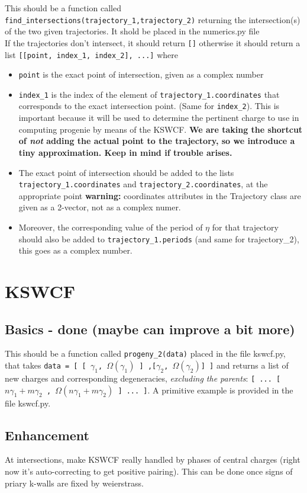 \documentclass[11pt]{report}
\begin{document}
This should be a function called \texttt{find\_intersections(trajectory\_1,trajectory\_2)} returning the intersection(s) of the two given trajectories. It shold be placed in the numerics.py file\\
If the trajectories don't intersect, it should return {\tt []} otherwise it should return a list {\tt [[point, index\_1, index\_2], ...]} where
\begin{itemize}
\item {\tt point} is the exact point of intersection, given as a complex number 
\item {\tt index\_1} is the index of the element of {\tt trajectory\_1.coordinates} that corresponds to the exact intersection point. (Same for {\tt index\_2}). This is important because it will be used to determine the pertinent charge to use in computing progenie by means of the KSWCF. {\bf We are taking the shortcut of \emph{not} adding the actual point to the trajectory, so we introduce a tiny approximation. Keep in mind if trouble arises.}
\item The exact point of intersection should be added to the lists {\tt trajectory\_1.coordinates} and {\tt trajectory\_2.coordinates}, at the appropriate point {\bf warning:} coordinates attributes in the Trajectory class are given as a 2-vector, not as a complex numer. 
\item Moreover, the corresponding value of the period of $\eta$ for that trajectory should also be added to {\tt trajectory\_1.periods} (and same for trajectory\_2), this goes as a complex number.
\end{itemize}

\section{KSWCF}
\subsection{Basics - {\color{red} \bf done} {\tiny \bf (maybe can improve a bit more)}}
This should be a function called {\tt progeny\_2(data)} placed in the file kswcf.py, that takes {\tt data = [ [ $\gamma_{1}$, $\Omega(\gamma_{1})$  ] ,[$\gamma_{2}$, $\Omega(\gamma_{2})$] ]} and returns a list of new charges and corresponding degeneracies, \emph{excluding the parents}:
{\tt [ ...  [ $n \gamma_{1}+ m \gamma_{2}$ , $\Omega(n \gamma_{1}+ m \gamma_{2})$  ]  ... ]}.
A primitive example is provided in the file kswcf.py.

\subsection{Enhancement}
At intersections, make KSWCF really handled by phases of central charges (right now it's auto-correcting to get positive pairing). This can be done once signs of priary k-walls are fixed by weierstrass.
\end{document}

